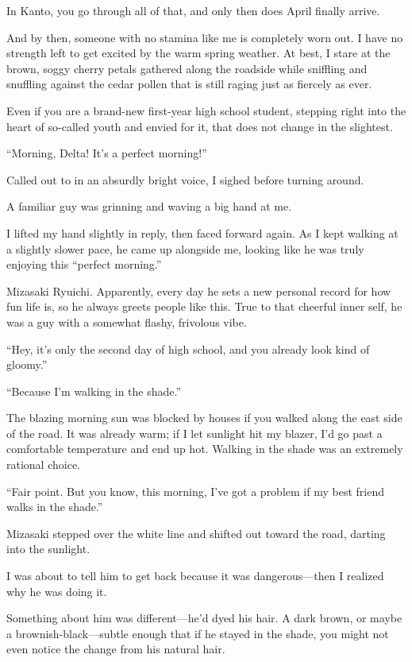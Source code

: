 \documentclass[
    a4paper,
    12pt,
    twoside,
    openany,
    UTF8,
    fontset=windows
]{ctexbook}
\begin{document}
In Kanto, you go through all of that, and only then does April finally arrive.

And by then, someone with no stamina like me is completely worn out. I have no strength left to get excited by the warm spring weather. At best, I stare at the brown, soggy cherry petals gathered along the roadside while sniffling and snuffling against the cedar pollen that is still raging just as fiercely as ever.

Even if you are a brand-new first-year high school student, stepping right into the heart of so-called youth and envied for it, that does not change in the slightest.

``Morning, Delta! It's a perfect morning!''

Called out to in an absurdly bright voice, I sighed before turning around.

A familiar guy was grinning and waving a big hand at me.

I lifted my hand slightly in reply, then faced forward again. As I kept walking at a slightly slower pace, he came up alongside me, looking like he was truly enjoying this ``perfect morning.''

Mizasaki Ryuichi. Apparently, every day he sets a new personal record for how fun life is, so he always greets people like this. True to that cheerful inner self, he was a guy with a somewhat flashy, frivolous vibe.

``Hey, it's only the second day of high school, and you already look kind of gloomy.''

``Because I'm walking in the shade.''

The blazing morning sun was blocked by houses if you walked along the east side of the road. It was already warm; if I let sunlight hit my blazer, I'd go past a comfortable temperature and end up hot. Walking in the shade was an extremely rational choice.

``Fair point. But you know, this morning, I've got a problem if my best friend walks in the shade.''

Mizasaki stepped over the white line and shifted out toward the road, darting into the sunlight.

I was about to tell him to get back because it was dangerous---then I realized why he was doing it.

Something about him was different---he'd dyed his hair. A dark brown, or maybe a brownish-black---subtle enough that if he stayed in the shade, you might not even notice the change from his natural hair.
\end{document}
